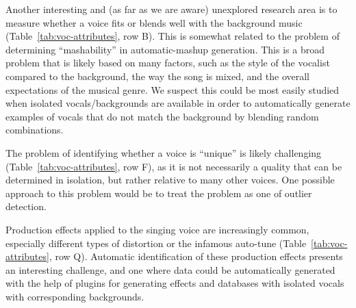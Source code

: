 \documentclass{article}
\begin{document}

Another interesting and (as far as we are aware) unexplored research area is to measure whether a voice fits or blends well with the background music (Table~\ref{tab:voc-attributes}, row B).
This is somewhat related to the problem of determining ``mashability'' in automatic-mashup generation.
This is a broad problem that is likely based on many factors, such as the style of the vocalist compared to the background, the way the song is mixed, and the overall expectations of the musical genre.
We suspect this could be most easily studied when isolated vocals/backgrounds are available in order to automatically generate examples of vocals that do not match the background by blending random combinations.

The problem of identifying whether a voice is ``unique'' is likely challenging (Table~\ref{tab:voc-attributes}, row F), as it is not necessarily a quality that can be determined in isolation, but rather relative to many other voices.
One possible approach to this problem would be to treat the problem as one of outlier detection.

Production effects applied to the singing voice are increasingly common, especially different types of distortion or the infamous auto-tune (Table~\ref{tab:voc-attributes}, row Q).
Automatic identification of these production effects presents an interesting challenge, and one where data could be automatically generated with the help of plugins for generating effects and databases with isolated vocals with corresponding backgrounds.
\end{document}

